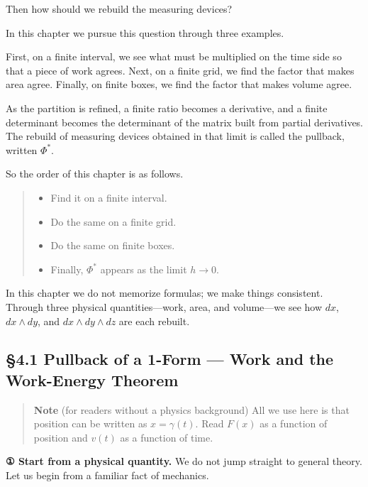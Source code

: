 Then how should we rebuild the measuring devices?

In this chapter we pursue this question through three examples.

First, on a finite interval, we see what must be multiplied on the time
side so that a piece of work agrees. Next, on a finite grid, we find the
factor that makes area agree. Finally, on finite boxes, we find the
factor that makes volume agree.

As the partition is refined, a finite ratio becomes a derivative, and a
finite determinant becomes the determinant of the matrix built from
partial derivatives. The rebuild of measuring devices obtained in that
limit is called the pullback, written \(\Phi^*\).

So the order of this chapter is as follows.

\begin{quote}
\begin{itemize}
\item
  Find it on a finite interval.
\item
  Do the same on a finite grid.
\item
  Do the same on finite boxes.
\item
  Finally, \(\Phi^*\) appears as the limit \(h\to0\).
\end{itemize}
\end{quote}

In this chapter we do not memorize formulas; we make things consistent.
Through three physical quantities---work, area, and volume---we see how
\(dx\), \(dx \wedge dy\), and \(dx \wedge dy \wedge dz\) are each
rebuilt.

\hypertarget{pullback-of-a-1-form-work-and-the-work-energy-theorem}{%
\subsection{§4.1 Pullback of a 1-Form --- Work and the Work-Energy
Theorem}\label{pullback-of-a-1-form-work-and-the-work-energy-theorem}}

\begin{quote}
\textbf{Note} (for readers without a physics background) All we use here
is that position can be written as \(x=\gamma(t)\). Read \(F(x)\) as a
function of position and \(v(t)\) as a function of time.
\end{quote}

\textbf{① Start from a physical quantity.} We do not jump straight to
general theory. Let us begin from a familiar fact of mechanics.

